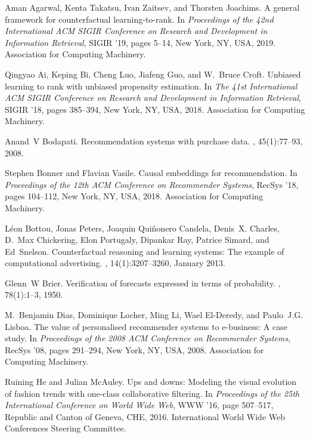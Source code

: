 \documentclass[manuscript,screen]{acmart}
\begin{document}
\providecommand*\hyphen{-}\providecommand*\quotation{’}
\begin{thebibliography}{10}
	
	Aman Agarwal, Kenta Takatsu, Ivan Zaitsev, and Thorsten Joachims.
	\newblock A general framework for counterfactual learning-to-rank.
	\newblock In {\em Proceedings of the 42nd International ACM SIGIR Conference on
		Research and Development in Information Retrieval}, SIGIR '19, pages
	5--14, New York, NY, USA, 2019. Association for Computing Machinery.
	
	Qingyao Ai, Keping Bi, Cheng Luo, Jiafeng Guo, and W.~Bruce Croft.
	\newblock Unbiased learning to rank with unbiased propensity estimation.
	\newblock In {\em The 41st International ACM SIGIR Conference on Research and
		Development in Information Retrieval}, SIGIR '18, pages 385--394, New
	York, NY, USA, 2018. Association for Computing Machinery.
	
	Anand~V Bodapati.
	\newblock Recommendation systems with purchase data.
	, 45(1):77--93, 2008.
	
	Stephen Bonner and Flavian Vasile.
	\newblock Causal embeddings for recommendation.
	\newblock In {\em Proceedings of the 12th ACM Conference on Recommender
		Systems}, RecSys '18, pages 104--112, New York, NY, USA, 2018.
	Association for Computing Machinery.
	
	L\'{e}on Bottou, Jonas Peters, Joaquin Qui\~{n}onero Candela, Denis~X. Charles,
	D.~Max Chickering, Elon Portugaly, Dipankar Ray, Patrice Simard, and
	Ed~Snelson.
	\newblock Counterfactual reasoning and learning systems: The example of
	computational advertising.
	, 14(1):3207–3260, January 2013.
	
	Glenn~W Brier.
	\newblock Verification of forecasts expressed in terms of probability.
	, 78(1):1--3, 1950.
	
	M.~Benjamin Dias, Dominique Locher, Ming Li, Wael El-Deredy, and Paulo~J.G.
	Lisboa.
	\newblock The value of personalised recommender systems to e-business: A case
	study.
	\newblock In {\em Proceedings of the 2008 ACM Conference on Recommender
		Systems}, RecSys '08, pages 291--294, New York, NY, USA, 2008.
	Association for Computing Machinery.
	
	Ruining He and Julian McAuley.
	\newblock Ups and downs: Modeling the visual evolution of fashion trends with
	one-class collaborative filtering.
	\newblock In {\em Proceedings of the 25th International Conference on World
		Wide Web}, WWW '16, page 507--517, Republic and Canton of Geneva, CHE,
	2016. International World Wide Web Conferences Steering Committee.
	

\end{thebibliography}
\end{document}
